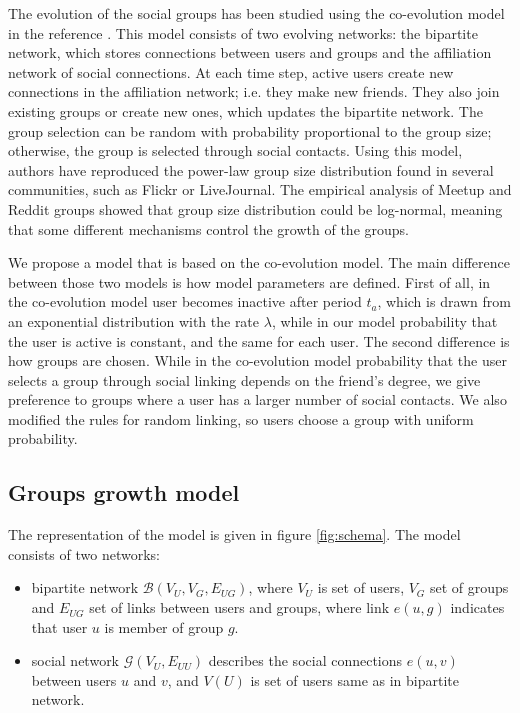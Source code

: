 The evolution of the social groups has been studied using the co-evolution model in the reference  \cite{zheleva2009co}. This model consists of two evolving networks: the bipartite network, which stores connections between users and groups and the affiliation network of social connections. At each time step, active users create new connections in the affiliation network; i.e. they make new friends. They also join existing groups or create new ones, which updates the bipartite network. The group selection can be random with probability proportional to the group size; otherwise, the group is selected through social contacts. Using this model, authors have reproduced the power-law group size distribution found in several communities, such as Flickr or LiveJournal. The empirical analysis of Meetup and Reddit groups showed that group size distribution could be log-normal, meaning that some different mechanisms control the growth of the groups.

We propose a model that is based on the co-evolution model. The main difference between those two models is how model parameters are defined. First of all, in the co-evolution model user becomes inactive after period $t_a$, which is drawn from an exponential distribution with the rate $\lambda$, while in our model probability that the user is active is constant, and the same for each user. The second difference is how groups are chosen. While in the co-evolution model probability that the user selects a group through social linking depends on the friend's degree, we give preference to groups where a user has a larger number of social contacts. We also modified the rules for random linking, so users choose a group with uniform probability.

\subsection{Groups growth model}

The representation of the model is given in figure \ref{fig:schema}. The model consists of two networks:
\begin{itemize}
	\item bipartite network $\mathcal{B}(V_{U}, V_{G}, E_{UG})$, where $V_U$ is set of users, $V_G$ set of groups and $E_{UG}$ set of links between users and groups, where link $e(u,g)$ indicates that user $u$ is member of group $g$.
	\item social network $\mathcal{G}(V_{U},E_{UU})$ describes the social connections $e(u, v)$ between users $u$ and $v$, and  $V(U)$ is set of users same as in bipartite network. 
\end{itemize}

